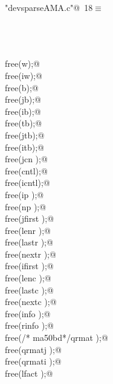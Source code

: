 \documentclass[12pt]{article}
\begin{document}
\begin{flushleft} \small
\begin{minipage}{\linewidth}\label{scrap6}\raggedright\small
{} \verb@"devsparseAMA.c"@\nobreak\ {\footnotesize {18}}$\equiv$
\vspace{-1ex}
\begin{list}{}{} \item
\mbox{}\verb@@\\
\mbox{}\verb@@\\
\mbox{}\verb@@\\
\mbox{}\verb@        free(w);@\\
\mbox{}\verb@        free(iw);@\\
\mbox{}\verb@        free(b);@\\
\mbox{}\verb@        free(jb);@\\
\mbox{}\verb@        free(ib);@\\
\mbox{}\verb@        free(tb);@\\
\mbox{}\verb@        free(jtb);@\\
\mbox{}\verb@        free(itb);@\\
\mbox{}\verb@        free(jcn );@\\
\mbox{}\verb@        free(cntl);@\\
\mbox{}\verb@        free(icntl);@\\
\mbox{}\verb@        free(ip );@\\
\mbox{}\verb@        free(np );@\\
\mbox{}\verb@        free(jfirst );@\\
\mbox{}\verb@        free(lenr );@\\
\mbox{}\verb@        free(lastr );@\\
\mbox{}\verb@        free(nextr );@\\
\mbox{}\verb@        free(ifirst );@\\
\mbox{}\verb@        free(lenc );@\\
\mbox{}\verb@        free(lastc );@\\
\mbox{}\verb@        free(nextc );@\\
\mbox{}\verb@        free(info );@\\
\mbox{}\verb@        free(rinfo );@\\
\mbox{}\verb@        free(/* ma50bd*/qrmat );@\\
\mbox{}\verb@        free(qrmatj );@\\
\mbox{}\verb@        free(qrmati );@\\
\mbox{}\verb@        free(lfact );@\\

\end{list}
\end{minipage}
\end{flushleft}
\end{document}

